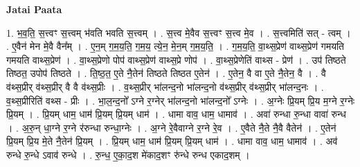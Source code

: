 \documentclass[17pt]{extarticle}
\begin{document}
\textbf{Jatai Paata} \newline

1. भ॒व॒ति॒ स॒त्त्वꣳ स॒त्त्वम् भ॑वति भवति स॒त्त्वम् । . स॒त्त्व मे॒वैव स॒त्त्वꣳ स॒त्त्व मे॒व । . स॒त्त्वमिति॑ सत् - त्वम् । . ए॒वैन॑ मेन मे॒वै वैन᳚म् । . ए॒न॒म् ग॒म॒य॒ति॒ ग॒म॒य॒ त्ये॒न॒ मे॒न॒म् ग॒म॒य॒ति॒ । . ग॒म॒य॒ति॒ वा॒थ्स॒प्रेण॑ वाथ्स॒प्रेण॑ गमयति गमयति वाथ्स॒प्रेण॑ । . वा॒थ्स॒प्रेणो पोप॑ वाथ्स॒प्रेण॑ वाथ्स॒प्रे णोप॑ । . वा॒थ्स॒प्रेणेति॑ वाथ्स - प्रेण॑ । . उप॑ तिष्ठते तिष्ठत॒ उपोप॑ तिष्ठते । . ति॒ष्ठ॒त॒ ए॒ते नै॒तेन॑ तिष्ठते तिष्ठत ए॒तेन॑ । . ए॒तेन॒ वै वा ए॒ते नै॒तेन॒ वै । . वै व॑थ्स॒प्रीर् व॑थ्स॒प्रीर् वै वै व॑थ्स॒प्रीः । . व॒थ्स॒प्रीर् भा॑लन्द॒नो भा॑लन्द॒नो व॑थ्स॒प्रीर् व॑थ्स॒प्रीर् भा॑लन्द॒नः । . व॒थ्स॒प्रीरिति॑ वथ्स - प्रीः । . भा॒ल॒न्द॒नो᳚ ऽग्ने र॒ग्नेर् भा॑लन्द॒नो भा॑लन्द॒नो᳚ ऽग्नेः । . अ॒ग्नेः प्रि॒यम् प्रि॒य म॒ग्ने र॒ग्नेः प्रि॒यम् । . प्रि॒यम् धाम॒ धाम॑ प्रि॒यम् प्रि॒यम् धाम॑ । . धामा वाव॒ धाम॒ धामाव॑ । . अवा॑ रुन्धा रु॒न्धा वावा॑ रुन्ध । . अ॒रु॒न् धा॒ग्ने र॒ग्ने र॑रुन्धा रुन्धा॒ग्नेः । . अ॒ग्ने रे॒वैवाग्ने र॒ग्ने रे॒व । . ए॒वैते नै॒ते नै॒वै वैतेन॑ । . ए॒तेन॑ प्रि॒यम् प्रि॒य मे॒ते नै॒तेन॑ प्रि॒यम् । . प्रि॒यम् धाम॒ धाम॑ प्रि॒यम् प्रि॒यम् धाम॑ । . धामा वाव॒ धाम॒ धामाव॑ । . अव॑ रुन्धे रु॒न्धे ऽवाव॑ रुन्धे । . रु॒न्ध॒ ए॒का॒द॒श मे॑काद॒शꣳ रु॑न्धे रुन्ध एकाद॒शम् । \newline
\end{document}
